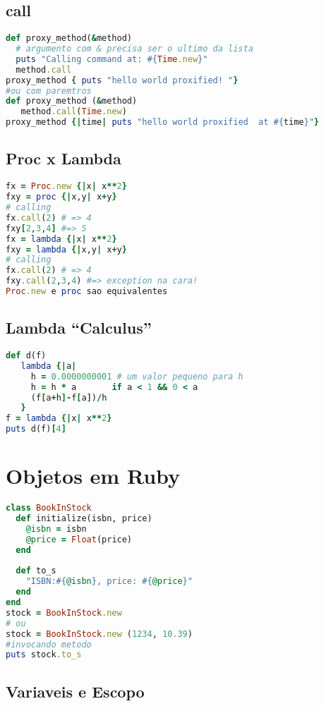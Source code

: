 \documentclass[serif,mathserif]{book}
\begin{document}
\section{call}
\begin{lstlisting}[language=ruby]
def proxy_method(&method)
  # argumento com & precisa ser o ultimo da lista
  puts "Calling command at: #{Time.new}"
  method.call
proxy_method { puts "hello world proxified! "}
#ou com paremtros
def proxy_method (&method)
   method.call(Time.new)
proxy_method {|time| puts "hello world proxified  at #{time}"}
\end{lstlisting}

\section{Proc x Lambda}
\begin{lstlisting}[language=ruby]
fx = Proc.new {|x| x**2}
fxy = proc {|x,y| x+y}
# calling
fx.call(2) # => 4
fxy[2,3,4] #=> 5
fx = lambda {|x| x**2}
fxy = lambda {|x,y| x+y}
# calling
fx.call(2) # => 4
fxy.call(2,3,4) #=> exception na cara!
Proc.new e proc sao equivalentes
\end{lstlisting}


\section{Lambda ``Calculus''}

\begin{lstlisting}[language=ruby, caption="Derivada em Ruby"]
def d(f)
   lambda {|a|
     h = 0.0000000001 # um valor pequeno para h
     h = h * a       if a < 1 && 0 < a
     (f[a+h]-f[a])/h
   }
f = lambda {|x| x**2}
puts d(f)[4]
\end{lstlisting}

\chapter{Objetos em Ruby}
\begin{lstlisting}[language=ruby]
class BookInStock
  def initialize(isbn, price)
    @isbn = isbn
    @price = Float(price)
  end
 
  def to_s
    "ISBN:#{@isbn}, price: #{@price}"
  end
end
stock = BookInStock.new
# ou
stock = BookInStock.new (1234, 10.39)
#invocando metodo
puts stock.to_s
\end{lstlisting}


\section{Variaveis e Escopo}
\end{document}
